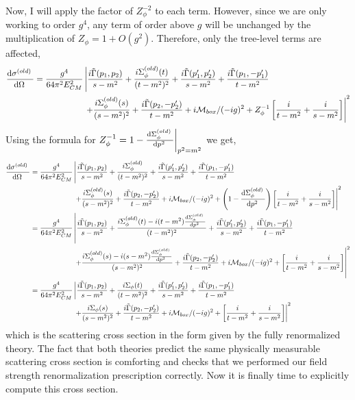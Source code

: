 \documentclass{article}
\begin{document}
Now, I will apply the factor of $Z_\phi^{-2}$ to each term. However, since we are only working to order $g^4$, any term of order above $g$ will be unchanged by the multiplication of $Z_\phi = 1 + O(g^2)$. Therefore, only the tree-level terms are affected,
\begin{align*}
\frac{\mathrm{d}\sigma^{(old)} \:}{\mathrm{d}\Omega \:} &= \frac{g^4}{64 \pi^2 E_{CM}^2} \left|  \frac{ i\tilde{\Gamma}(p_1, p_2)}{s  - m^2} + \frac{i \Sigma_\phi^{(old)}(t)}{(t - m^2)^2} + \frac{i\tilde{\Gamma}(p_1', p_2')}{s - m^2} 
+  \frac{i\tilde{\Gamma}(p_1, -p_1')}{t - m^2} \right.
\\ 
& \left.
\quad \quad \quad \quad \quad \quad 
+ \frac{i \Sigma_\phi^{(old)}(s)}{(s - m^2)^2} + \frac{i\tilde{\Gamma}(p_2, -p_2')}{t - m^2} + i\mathcal{M}_{box}/(-ig)^2 + Z_\phi^{-1} \left[\frac{i}{t - m^2 } + \frac{i}{s - m^2 }\right] \right|^2 
\end{align*}  
Using the formula for $Z_\phi^{-1} = 1 - \frac{\mathrm{d}\Sigma_\phi^{(old)} \:}{\mathrm{d}p^2 \:} \bigg|_{p^2 = m^2}$ we get,
\begin{align*}
\frac{\mathrm{d}\sigma^{(old)} \:}{\mathrm{d}\Omega \:} &= \frac{g^4}{64 \pi^2 E_{CM}^2} \left|  \frac{i\tilde{\Gamma}(p_1, p_2)}{s  - m^2} + \frac{i \Sigma_\phi^{(old)}}{(t - m^2)^2} + \frac{i\tilde{\Gamma}(p_1', p_2')}{s - m^2} 
+  \frac{i\tilde{\Gamma}(p_1, -p_1')}{t - m^2} \right.
\\ 
& \left.
\quad \quad \quad \quad \quad \quad 
+ \frac{i \Sigma_\phi^{(old)}(s)}{(s - m^2)^2} + \frac{i\tilde{\Gamma}(p_2, -p_2')}{t - m^2} + i\mathcal{M}_{box}/(-ig)^2 + \left( 1 - \frac{\mathrm{d}\Sigma_\phi^{(old)} \:}{\mathrm{d}p^2 \:} \right) \left[\frac{i}{t - m^2 } + \frac{i}{s - m^2 }\right] \right|^2  
\\
&= \frac{g^4}{64 \pi^2 E_{CM}^2} \left|  \frac{ i\tilde{\Gamma}(p_1, p_2)}{s  - m^2} + \frac{i \Sigma_\phi^{(old)}(t) - i(t - m^2) \frac{\mathrm{d}\Sigma_\phi^{(old)} \:}{\mathrm{d}p^2 \:}}{(t - m^2)^2} + \frac{i\tilde{\Gamma}(p_1', p_2')}{s - m^2} 
+  \frac{i\tilde{\Gamma}(p_1, -p_1')}{t - m^2} \right.
\\ 
& \left.
\quad \quad \quad \quad \quad \quad 
+ \frac{i \Sigma_\phi^{(old)}(s) - i(s - m^2) \frac{\mathrm{d}\Sigma_\phi^{(old)} \:}{\mathrm{d}p^2 \:} }{(s - m^2)^2} + \frac{i\tilde{\Gamma}(p_2, -p_2')}{t - m^2} + i\mathcal{M}_{box}/(-ig)^2 + \left[\frac{i}{t - m^2 } + \frac{i}{s - m^2 }\right] \right|^2
\\
&= \frac{g^4}{64 \pi^2 E_{CM}^2} \left|  \frac{i \tilde{\Gamma}(p_1, p_2)}{s  - m^2} + \frac{i \Sigma_\phi(t)}{(t - m^2)^2} + \frac{i\tilde{\Gamma}(p_1', p_2')}{s - m^2} 
+  \frac{i\tilde{\Gamma}(p_1, -p_1')}{t - m^2} \right.
\\ 
& \left.
\quad \quad \quad \quad \quad \quad 
+ \frac{i \Sigma_\phi(s)}{(s - m^2)^2} + \frac{i\tilde{\Gamma}(p_2, -p_2')}{t - m^2} + i\mathcal{M}_{box}/(-ig)^2 + \left[\frac{i}{t - m^2 } + \frac{i}{s - m^2 }\right] \right|^2    
\end{align*}  
which is the scattering cross section in the form given by the fully renormalized theory. The fact that both theories predict the same physically measurable scattering cross section is comforting and checks that we performed our field strength renormalization prescription correctly. Now it is finally time to explicitly compute this cross section.
\end{document}
